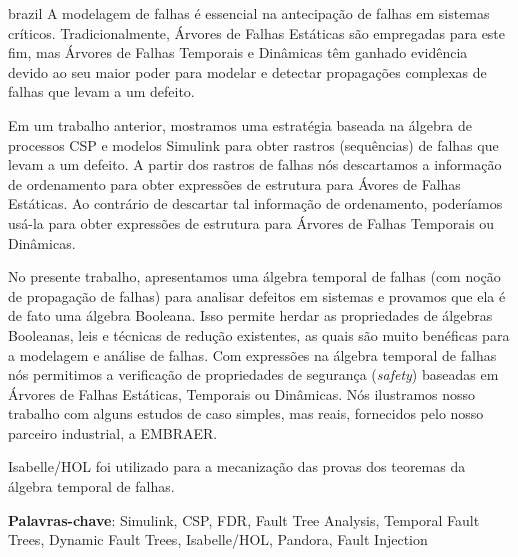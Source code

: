 \documentclass[12pt,openright,twoside,a4paper,oldfontcommands,english,brazil,final]{abntex2}
\theoremstyle{theo}
\begin{document}


\begin{resumo}[Resumo]
\begin{otherlanguage*}{brazil}
A modelagem de falhas é essencial na antecipação de falhas em sistemas críticos.
Tradicionalmente, Árvores de Falhas Estáticas são empregadas para este fim, mas Árvores de Falhas Temporais e Dinâmicas têm ganhado evidência devido ao seu maior poder para modelar e detectar propagações complexas de falhas que levam a um defeito.

Em um trabalho anterior, mostramos uma estratégia baseada na álgebra de processos CSP e modelos Simulink para obter rastros (sequências) de falhas que levam a um defeito.
A partir dos rastros de falhas nós descartamos a informação de ordenamento para obter expressões de estrutura  para Ávores de Falhas Estáticas.
Ao contrário de descartar tal informação de ordenamento, poderíamos usá-la para obter expressões de estrutura para Árvores de Falhas Temporais ou Dinâmicas.

No presente trabalho, apresentamos uma álgebra temporal de falhas (com noção de propagação de falhas) para analisar defeitos em sistemas e provamos que ela é de fato uma álgebra Booleana.
Isso permite herdar as propriedades de álgebras Booleanas, leis e técnicas de redução existentes, as quais são muito benéficas para a modelagem e análise de falhas.
Com expressões na álgebra temporal de falhas nós permitimos a verificação de propriedades de segurança (\emph{safety}) baseadas em Árvores de Falhas Estáticas, Temporais ou Dinâmicas.
Nós ilustramos nosso trabalho com alguns estudos de caso simples, mas reais, fornecidos pelo nosso parceiro industrial, a EMBRAER.

Isabelle/HOL foi utilizado para a mecanização das provas dos teoremas da álgebra temporal de falhas.

\vspace{\onelineskip}
\noindent
\textbf{Palavras-chave}: Simulink, CSP, FDR, Fault Tree Analysis, Temporal Fault Trees, Dynamic Fault Trees, Isabelle/HOL, Pandora, Fault Injection
\end{otherlanguage*}
\end{resumo}
\end{document}
